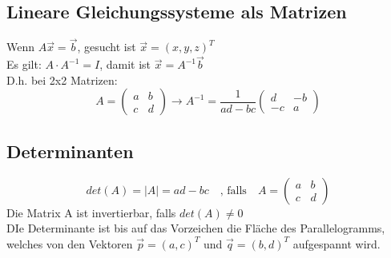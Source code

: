 \documentclass{report}
\begin{document}
\subsection{Lineare Gleichungssysteme als Matrizen}
Wenn $A\vec{x} = \vec{b}$, gesucht ist $\vec{x} = (x,y,z)^T$\\
Es gilt: $A \cdot A^{-1} = I$, damit ist $\vec{x} = A^{-1} \vec{b}$\\
D.h. bei 2x2 Matrizen:
\begin{equation}A = \left(\begin{matrix}a & b\\c & d\end{matrix}\right) \to A^{-1} = \frac{1}{ad -bc}\left(\begin{matrix}d & -b\\-c & a\end{matrix}\right)\end{equation}
\subsection{Determinanten}
\begin{equation}det(A) = |A| = ad-bc \quad \mbox{, falls} \quad A = \left(\begin{matrix}a & b\\c & d\end{matrix}\right) \end{equation}
Die Matrix A ist invertierbar, falls $det(A) \neq 0$\\
DIe Determinante ist bis auf das Vorzeichen die Fläche des Parallelogramms, welches von den Vektoren $\vec{p} = (a,c)^T$ und $\vec{q} = (b,d)^T$ aufgespannt wird.
\end{document}
